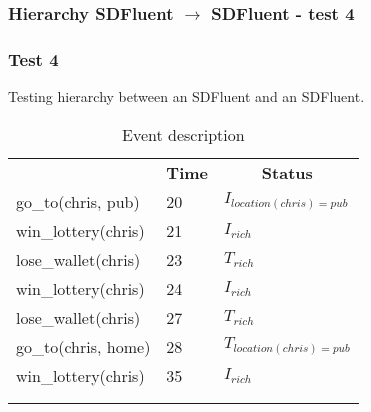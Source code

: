 \documentclass[8pt]{beamer}
\begin{document}
\begin{frame}
    \frametitle{Hierarchy SDFluent $\rightarrow$  SDFluent - test 4}
    \subsubsection{Test 4}
    \small Testing hierarchy between an SDFluent and an SDFluent.\linebreak
    \begin{minipage}{0.48\linewidth}
        \begin{table}[t!]
            \caption{Event description}
            \begin{center}

                \begin{tabular}{lll}
                    \hline\noalign{\smallskip}
                    \multicolumn{1}{l}{\textbf{Event}} & \multicolumn{1}{c}{\textbf{Time}} & \multicolumn{1}{c}{\textbf{Status}}  \\
                    go\_to(chris, pub)& 20 & $I_{location(chris)=pub}$\\
                    win\_lottery(chris)&21 &$I_{rich}$\\
                    lose\_wallet(chris)& 23 &$T_{rich}$\\
                    win\_lottery(chris)& 24 &$I_{rich}$\\
                    lose\_wallet(chris)& 27 &$T_{rich}$\\
                    go\_to(chris, home)& 28 &$T_{location(chris)=pub}$\\
                    win\_lottery(chris)& 35&$I_{rich}$\\\\
                    \noalign{\smallskip}
                    \hline
                \end{tabular}
            \end{center}
        \end{table}
    \end{minipage}
    \begin{minipage}{0.48\linewidth}


\end{minipage}
\end{frame}
\end{document}
